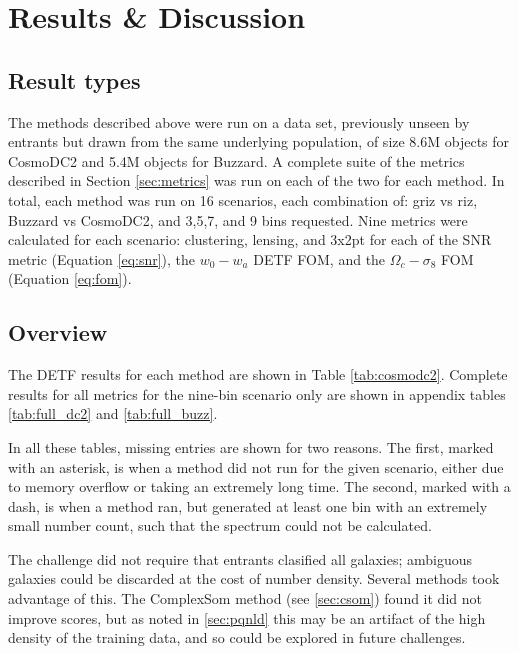 \documentclass[twocolumn,twocolappendix]{aastex63}
\begin{document}
\section{Results \& Discussion} \label{sec:results}

\subsection{Result types}

The methods described above were run on a data set, previously unseen by entrants but drawn
from the same underlying population, of size 8.6M objects for CosmoDC2 and 5.4M objects for Buzzard.
A complete suite of the metrics described in Section \ref{sec:metrics} was run on each of the two
for each method.  In total, each method was run on 16 scenarios, each combination of: griz vs riz,
Buzzard vs CosmoDC2, and 3,5,7, and 9 bins requested.  Nine metrics were calculated for each
scenario: clustering, lensing, and 3x2pt for each of the SNR metric (Equation \ref{eq:snr}), the $w_0-w_a$ 
DETF FOM, and the $\Omega_c - \sigma_8$ FOM (Equation \ref{eq:fom}).


\subsection{Overview}

The DETF results for each method are shown in Table \ref{tab:cosmodc2}.  Complete results for all metrics
for the nine-bin scenario only are shown in appendix tables \ref{tab:full_dc2} and \ref{tab:full_buzz}.  

In all these tables, missing entries are shown for two reasons.
The first, marked with an asterisk, is when a method did not run for the given scenario,
either due to memory overflow or taking an extremely long time.
The second, marked with a dash, is when a method ran, but generated at least one bin with an extremely 
small number count, such that the spectrum could not be calculated.

The challenge did not require that entrants clasified all galaxies; ambiguous
galaxies could be discarded at the cost of number density.  Several methods
took advantage of this.  The ComplexSom method (see \autoref{sec:csom}) found
it did not improve scores, but as noted in \autoref{sec:pqnld} this may be an artifact
of the high density of the training data, and so could be explored in future challenges.
\end{document}
